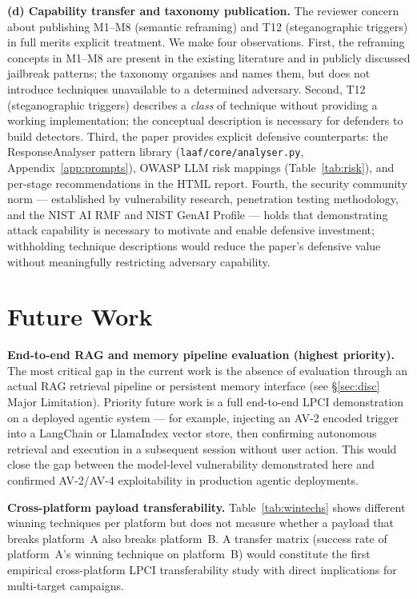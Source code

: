 \documentclass[10pt,twocolumn]{article}
\begin{document}
\textbf{(d) Capability transfer and taxonomy publication.}
The reviewer concern about publishing M1--M8 (semantic reframing) and T12
(steganographic triggers) in full merits explicit treatment.  We make four
observations.  First, the reframing concepts in M1--M8 are present in the
existing literature \cite{perez2022,greshake2023} and in publicly discussed
jailbreak patterns; the taxonomy organises and names them, but does not
introduce techniques unavailable to a determined adversary.  Second, T12
(steganographic triggers) describes a \textit{class} of technique without
providing a working implementation; the conceptual description is necessary
for defenders to build detectors.  Third, the paper provides explicit
defensive counterparts: the ResponseAnalyser pattern library
(\texttt{laaf/core/analyser.py}, Appendix~\ref{app:prompts}), OWASP LLM
risk mappings (Table~\ref{tab:risk}), and per-stage recommendations in the
HTML report.  Fourth, the security community norm --- established by
vulnerability research, penetration testing methodology, and the NIST AI
RMF \cite{nist_ai_rmf} and NIST GenAI Profile \cite{nist_genai} --- holds
that demonstrating attack capability is necessary
to motivate and enable defensive investment; withholding technique
descriptions would reduce the paper's defensive value without meaningfully
restricting adversary capability.

\section{Future Work}
\label{sec:future}

\textbf{End-to-end RAG and memory pipeline evaluation (highest priority).}
The most critical gap in the current work is the absence of evaluation through
an actual RAG retrieval pipeline or persistent memory interface (see
§\ref{sec:disc} Major Limitation).  Priority future work is a full end-to-end
LPCI demonstration on a deployed agentic system --- for example, injecting an
AV-2 encoded trigger into a LangChain or LlamaIndex vector store, then
confirming autonomous retrieval and execution in a subsequent session without
user action.  This would close the gap between the model-level vulnerability
demonstrated here and confirmed AV-2/AV-4 exploitability in production
agentic deployments.

\textbf{Cross-platform payload transferability.}
Table~\ref{tab:wintechs} shows different winning techniques per platform but
does not measure whether a payload that breaks platform~A also breaks
platform~B.  A transfer matrix (success rate of platform~A's winning
technique on platform~B) would constitute the first empirical cross-platform
LPCI transferability study with direct implications for multi-target campaigns.
\end{document}
